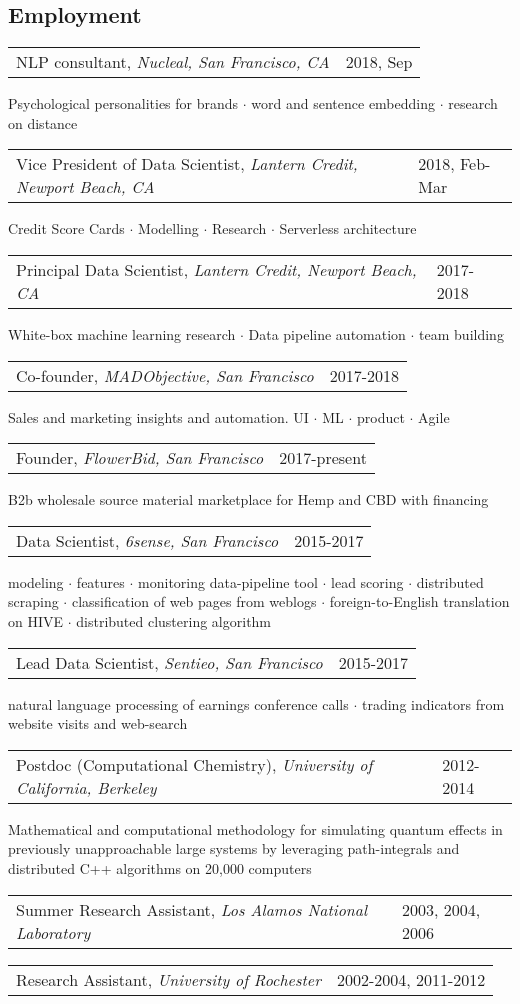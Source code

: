 \documentclass{res}
\makeatletter
\newcommand{\af}[3]{
\begin{tabular*}{\textwidth}[t]{@{}p{5.2in} l} 
    #1, \textit{#2} & #3\\
  \end{tabular*}
}
\newcommand{\aff}[4]{
\begin{tabular*}{\textwidth}[t]{@{}p{5.2in} l} 
    #1, \textit{#2} & #3\\
  \end{tabular*}
  {\color[RGB]{106,106,106} #4}\\
}
\makeatother
\begin{document}
 


\address{
  1632 Walnut St.\\
  Berkeley, CA 94709 \\
}
\address{
  (585) 313-6024\\
  kirill.igum@gmail.com\\
  \url{www.linkedin.com/in/kirilligum}
}

\begin{resume}

\section{Employment}
\aff{NLP consultant}{Nucleal, San Francisco, CA}{2018, Sep}{ 
	Psychological personalities for brands $\cdot$ word and sentence embedding $\cdot$ research on distance
} 
\aff{Vice President of Data Scientist}{Lantern Credit, Newport Beach, CA}{2018, Feb-Mar}{ 
	Credit Score Cards $\cdot$ Modelling $\cdot$ Research $\cdot$ Serverless architecture
} 
\aff{Principal Data Scientist}{Lantern Credit, Newport Beach, CA}{2017-2018}{ 
	White-box machine learning research $\cdot$ Data pipeline automation $\cdot$ team building
} 
\aff{Co-founder}{MADObjective, San Francisco}{2017-2018}{ 
	Sales and marketing insights and automation. UI $\cdot$ ML $\cdot$ product $\cdot$ Agile
} 
\aff{Founder}{FlowerBid, San Francisco}{2017-present}{ 
	B2b wholesale source material marketplace for Hemp and CBD with financing 
} 
\aff{Data Scientist}{6sense, San Francisco}{2015-2017}{ 
	modeling $\cdot$ 
	features $\cdot$  
	monitoring data-pipeline tool $\cdot$ 
	lead scoring $\cdot$
	distributed scraping $\cdot$
	classification of web pages from weblogs $\cdot$
	foreign-to-English translation on HIVE $\cdot$
	distributed clustering algorithm
} 
\aff{Lead Data Scientist}{Sentieo, San Francisco}{2015-2017}{ 
	natural language processing of earnings conference calls $\cdot$ trading indicators from website visits and web-search
} 
\aff{Postdoc (Computational Chemistry)}{University of California, Berkeley}{2012-2014}{ 
  Mathematical and computational methodology for simulating quantum effects in previously unapproachable large systems by leveraging path-integrals and distributed C++ algorithms on 20,000 computers
} 
\af{Summer Research Assistant}{Los Alamos National Laboratory}{2003, 2004, 2006}
\af{Research Assistant}{University of Rochester}{2002-2004, 2011-2012}
 

\end{resume}
\end{document}
